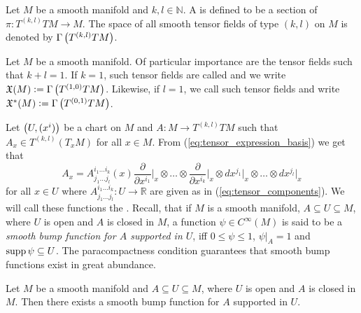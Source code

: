 \begin{definition}
	Let $M$ be a smooth manifold and $k,l \in \mathbb{N}$. A  is defined to be a section of $\pi : T^{(k,l)}TM \to M$. The space of all smooth tensor fields of type $(k,l)$ on $M$ is denoted by $\Gamma\del[1]{T^{(k,l)}TM}$.
\end{definition}

\begin{example}
	\label{ex:vector_and_covector_fields}
	Let $M$ be a smooth manifold. Of particular importance are the tensor fields such that $k + l = 1$. If $k = 1$, such tensor fields are called  and we write $\mathfrak{X}(M) := \Gamma\del[1]{T^{(1,0)}TM}$. Likewise, if $l = 1$, we call such tensor fields  and write $\mathfrak{X}^*(M) := \Gamma\del[1]{T^{(0,1)}TM}$.
\end{example}

Let $\del[1]{U,(x^i)}$ be a chart on $M$ and $A : M \to T^{(k,l)}TM$ such that $A_x \in T^{(k,l)}(T_xM)$ for all $x \in M$. From (\ref{eq:tensor_expression_basis}) we get that
\begin{equation*}
	A_x = A^{i_1\dots i_k}_{j_1\dots j_l}(x)\frac{\partial}{\partial x^{i_1}}\bigg\vert_x \otimes \dots \otimes \frac{\partial}{\partial x^{i_k}}\bigg\vert_x \otimes dx^{j_1}\vert_x \otimes \dots \otimes dx^{j_l}\vert_x
\end{equation*}
\noindent for all $x \in U$ where $A^{i_1\dots i_k}_{j_1\dots j_l} : U \to \mathbb{R}$ are given as in (\ref{eq:tensor_components}). We will call these functions the . Recall, that if $M$ is a smooth manifold, $A \subseteq U \subseteq M$, where $U$ is open and $A$ is closed in $M$, a function $\psi \in C^\infty(M)$ is said to be a \emph{smooth bump function for $A$ supported in $U$}, iff $0 \leq \psi \leq 1$, $\psi \vert_A = 1$ and $\operatorname{supp} \psi \subseteq U$. The paracompactness condition guarantees that smooth bump functions exist in great abundance.

\begin{proposition}
	\label{prop:existence_smooth_bump_functions}
	Let $M$ be a smooth manifold and $A \subseteq U \subseteq M$, where $U$ is open and $A$ is closed in $M$. Then there exists a smooth bump function for $A$ supported in $U$. 	
\end{proposition}

